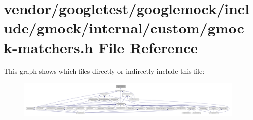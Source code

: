 \hypertarget{internal_2custom_2gmock-matchers_8h}{}\section{vendor/googletest/googlemock/include/gmock/internal/custom/gmock-\/matchers.h File Reference}
\label{internal_2custom_2gmock-matchers_8h}
This graph shows which files directly or indirectly include this file\+:
\nopagebreak
\begin{figure}[H]
\begin{center}
\leavevmode
\includegraphics[width=350pt]{internal_2custom_2gmock-matchers_8h__dep__incl}
\end{center}
\end{figure}
